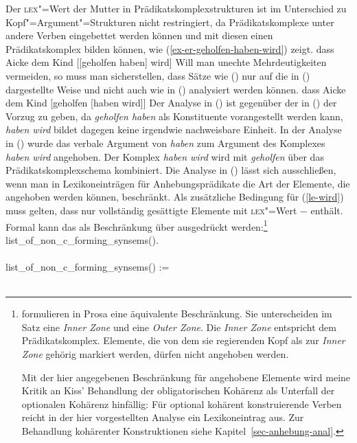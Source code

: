 Der \textsc{lex}"=Wert der Mutter in Prädikatskomplexstrukturen ist im Unterschied zu Kopf"=Argument"=Strukturen
nicht restringiert, da Prädikatskomplexe unter andere Verben eingebettet werden können 
und mit diesen einen Prädikatskomplex bilden können, wie (\ref{ex-er-geholfen-haben-wird}) zeigt.
\ea
\label{ex-er-geholfen-haben-wird}
dass Aicke dem Kind [[geholfen haben] wird]
\z
Will man unechte Mehrdeutigkeiten vermeiden, so muss man sicherstellen, dass Sätze wie () nur auf die
in () dargestellte Weise und nicht auch wie in () analysiert werden können.
\ea
\label{bsp-non-complex-forming}
dass Aicke dem Kind [geholfen [haben wird]]
\z
Der Analyse in () ist gegenüber der in () der Vorzug zu geben, da \emph{geholfen
haben} als Konstituente vorangestellt werden kann, \emph{haben wird} bildet dagegen keine irgendwie
nachweisbare Einheit.
In der Analyse in () wurde das verbale Argument von \emph{haben} zum Argument des Komplexes
\emph{haben wird} angehoben. Der Komplex \emph{haben wird} wird mit \emph{geholfen} über das Prädikatskomplexschema
kombiniert. Die Analyse in () lässt sich ausschließen, wenn man in Lexikoneinträgen für Anhebungsprädikate
die Art der Elemente, die angehoben werden können, beschränkt. Als zusätzliche Bedingung
für (\ref{le-wird}) muss gelten, dass  nur vollständig gesättigte
Elemente mit \textsc{lex}"=Wert $-$ enthält. Formal kann das als Beschränkung über 
ausgedrückt werden:\footnote{
        \citet{BvN98a} formulieren in Prosa eine äquivalente Beschränkung. Sie unterscheiden
        im Satz eine \emph{Inner Zone} und eine \emph{Outer Zone}. Die \emph{Inner Zone}
        entspricht dem Prädikatskomplex. Elemente, die von dem sie regierenden Kopf
        als zur \emph{Inner Zone} gehörig markiert werden, dürfen nicht angehoben werden.

Mit der hier angegebenen Beschränkung für angehobene Elemente wird
        meine Kritik \citep[--352]{Mueller99a} an Kiss' Behandlung der obligatorischen Kohärenz
        als Unterfall der optionalen Kohärenz \citep[]{Kiss95a} hinfällig: Für optional kohärent konstruierende
        Verben reicht in der hier vorgestellten Analyse ein Lexikoneintrag aus. Zur Behandlung
        kohärenter Konstruktionen siehe Kapitel~\ref{sec-anhebung-anal}.%
%
}
\eas
\label{constr-non-complex-forming}
list\_of\_non\_c\_forming\_synsems(\eliste).\\\\
list\_of\_non\_c\_forming\_synsems() :=\\\\

